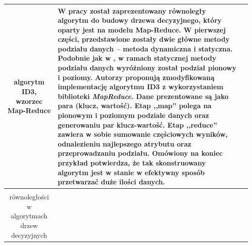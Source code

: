 \documentclass[12pt]{article}
\begin{document}
\begin{center}
\begin{longtable}{| c | p{} | p{} |}
            algorytm ID3, wzorzec Map-Reduce &

            W pracy został zaprezentowany równoległy algorytm do budowy drzewa decyzyjnego, 
            który oparty jest na modelu Map-Reduce. W pierwszej części, przedstawione zostały dwie główne metody podziału
            danych -- metoda dynamiczna i statyczna. Podobnie jak w \cite{parallel-implementation-decision-tree}, w ramach
            statycznej metody podziału danych wyróżniony został podział pionowy i poziomy. 
            Autorzy proponują zmodyfikowaną implementację algorytmu ID3 z wykorzystaniem biblioteki \textit{MapReduce}.
            Dane prezentowane są jako para (klucz, wartość). Etap ,,map'' polega na pionowym i poziomym podziale danych oraz generowaniu par klucz-wartość.
            Etap ,,reduce'' zawiera w sobie sumowanie częściowych wyników, odnalezieniu najlepszego atrybutu oraz
            przeprowadzaniu podziału. Omówiony na koniec przykład potwierdza, że tak skonstruowany algorytm jest w stanie
            w efektywny sposób przetwarzać duże ilości danych.\\

            \hline

        \caption{Zestawienie artykułów poruszających tematykę\\ równoległości w algorytmach drzew decyzyjnych}
        \label{table:articles-parallel-decision-tree}
 
        \end{longtable}

    \end{center}

\newpage

\listoftables
\listoffigures

\newpage
\end{document}
